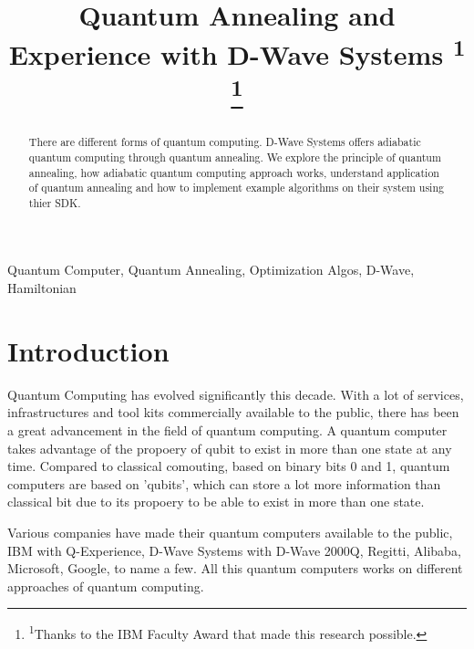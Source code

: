 \documentclass[12pt,conference]{IEEEtran}
\makeatletter
\let\old@ps@headings\ps@headings
\let\old@ps@IEEEtitlepagestyle\ps@IEEEtitlepagestyle
\def\confheader#1{%
\def\ps@IEEEtitlepagestyle{%
\old@ps@IEEEtitlepagestyle%
\def\@oddhead{\strut\hfill#1\hfill\strut}%
\def\@evenhead{\strut\hfill#1\hfill\strut}%
}%
\ps@headings%
}
\makeatother
\begin{document}
\title{Quantum Annealing and Experience with D-Wave Systems \textsuperscript{1} \thanks{ \textsuperscript{1}Thanks to the IBM Faculty Award that made this research possible.}}


\author{
}


\maketitle
\confheader{Proceedings of Student-Faculty Research Day Conference, CSIS, Pace University, May 3rd, 2019}

\begin{abstract}
There are different forms of quantum computing. D-Wave Systems offers adiabatic quantum computing through quantum annealing. We explore the principle of quantum annealing, how adiabatic quantum computing approach works, understand application of quantum annealing and how to implement example algorithms on their system using thier SDK.
\end{abstract}



\begin{IEEEkeywords}
Quantum Computer, Quantum Annealing, Optimization Algos, D-Wave, Hamiltonian
\end{IEEEkeywords}


\section{Introduction}
Quantum Computing has evolved significantly this decade. With a lot of services, infrastructures and tool kits commercially available to the public, there has been a great advancement in the field of quantum computing. A quantum computer takes advantage of the  propoery of qubit to exist in more than one state at any time. Compared to classical comouting, based on binary bits 0 and 1, quantum computers are based on 'qubits', which can store a lot more information than classical bit due to its propoery to be able to exist in more than one state. \cite{1}

Various companies have made their quantum computers available to the public, IBM with Q-Experience, D-Wave Systems with D-Wave 2000Q, Regitti, Alibaba, Microsoft, Google, to name a few. All this quantum computers works on different approaches of quantum computing.\cite{2}
\end{document}
